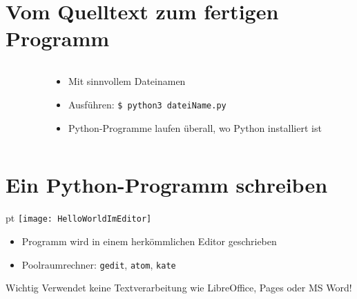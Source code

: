 \section{Vom Quelltext zum fertigen Programm}
\begin{frame}
	\slidehead

	\begin{columns}[T]
		\begin{column}{.3\textwidth}
		\end{column}
		\begin{column}{.7\textwidth}
			\begin{itemize}
				\item Mit sinnvollem Dateinamen
				\item Ausführen: \texttt{\$ python3 dateiName.py}
				\item Python-Programme laufen überall, wo Python installiert ist
			\end{itemize}
		\end{column}
	\end{columns}
\end{frame}

\section{Ein Python-Programm schreiben}
\begin{frame}
	\slidehead

	\begin{center}
		 pt
		\texttt{[image: HelloWorldImEditor]}
	\end{center}

	\begin{itemize}
		\item Programm wird in einem herkömmlichen Editor geschrieben
		\item Poolraumrechner: \texttt{gedit}, \texttt{atom}, \texttt{kate}
	\end{itemize}
	\begin{alertblock}{Wichtig}
		Verwendet keine Textverarbeitung wie LibreOffice, Pages oder MS Word!
	\end{alertblock}
\end{frame}

